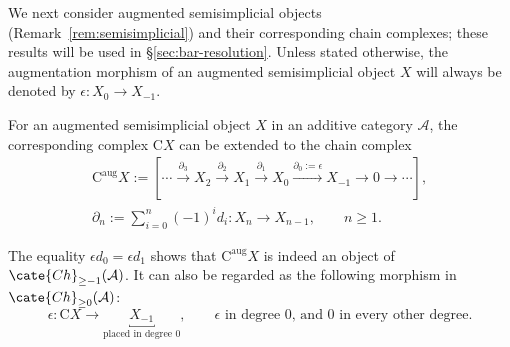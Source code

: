 We next consider augmented semisimplicial objects
(Remark~\ref{rem:semisimplicial}) and their corresponding chain complexes;
these results will be used in \S\ref{sec:bar-resolution}. Unless stated
otherwise, the augmentation morphism of an augmented semisimplicial object
$X$ will always be denoted by $\epsilon:X_0\to X_{-1}$.

\begin{definition}\label{def:augmented-C-cplx}
	For an augmented semisimplicial object $X$ in an additive category
	$\mathcal{A}$, the corresponding complex $\mathrm{C}X$ can be extended
	to the chain complex
	\begin{equation*}
		\begin{gathered}
			\mathrm{C}^{\mathrm{aug}}X:=
			\left[\cdots\xrightarrow{\partial_3}X_2
			\xrightarrow{\partial_2}X_1
			\xrightarrow{\partial_1}X_0
			\xrightarrow{\partial_0:=\epsilon}X_{-1}
			\to0\to\cdots\right],\\
			\partial_n:=\sum_{i=0}^n(-1)^id_i:X_n\to X_{n-1},
			\qquad n\geq1.
		\end{gathered}
	\end{equation*}
\end{definition}

The equality $\epsilon d_0=\epsilon d_1$ shows that
$\mathrm{C}^{\mathrm{aug}}X$ is indeed an object of
$\cate{Ch}_{\geq-1}(\mathcal{A})$. It can also be regarded as the following
morphism in $\cate{Ch}_{\geq0}(\mathcal{A})$:
\[
\epsilon:\mathrm{C}X\to
\underbracket{X_{-1}}_{\text{placed in degree $0$}},
\qquad\text{$\epsilon$ in degree $0$, and $0$ in every other degree}.
\]

